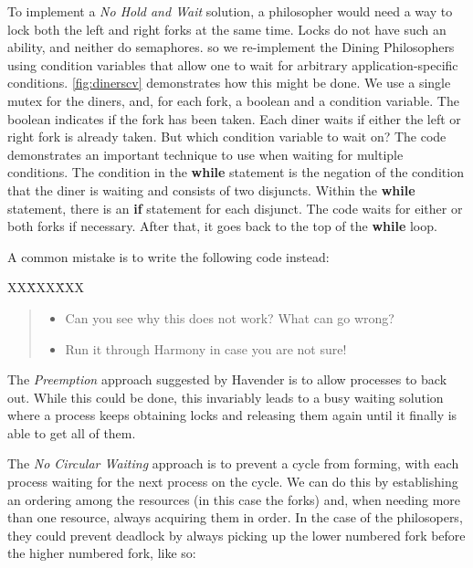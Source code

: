 \documentclass{report}
\newcommand{\harmonysource}[1]{
\begin{tabbing}
XX\=XXX\=XXX\kill
    
\end{tabbing}
}
\newenvironment{code}{
\tcolorbox
}{
\endtcolorbox
}
\begin{document}
To implement a \emph{No Hold and Wait} solution, a philosopher would need a
way to lock both the left and right forks at the same time.  Locks do not
have such an ability, and neither do semaphores. so we re-implement the
Dining Philosophers using condition variables that allow one to wait for
arbitrary application-specific conditions.
%
\autoref{fig:dinerscv} demonstrates how this might be done.
We use a single mutex for the diners, and, for each fork, a boolean
and a condition variable.  The boolean indicates if the fork has been
taken.
Each diner waits if either the left or right fork is already taken.
But which condition variable to wait on?
The code demonstrates an important technique to use when waiting for
multiple conditions.
%
The condition in the \textbf{while} statement is the negation of the
condition that the diner is waiting and consists of two disjuncts.
Within the \textbf{while} statement,
there is an \textbf{if} statement for each disjunct.
The code waits for either or both forks if necessary.  After that, it goes
back to the top of the \textbf{while} loop.

A common mistake is to write the following code instead:

\begin{code}
\harmonysource{baddblwait}
\end{code}

\begin{quote}
\begin{itemize}
\item Can you see why this does not work?  What can go wrong?
\item Run it through Harmony in case you are not sure!
\end{itemize}
\end{quote}

The \emph{Preemption} approach suggested by Havender is to allow processes to back out.
While this could be done, this invariably leads to a busy waiting solution
where a process keeps obtaining locks and releasing them again until it
finally is able to get all of them.

The \emph{No Circular Waiting} approach
is to prevent a cycle from forming, with each
process waiting for the next process on the cycle.
We can do this by establishing an ordering among the
resources (in this case the forks) and, when needing more than one
resource, always acquiring them in order.  In the case of the philosopers,
they could prevent deadlock by always picking up the lower numbered fork
before the higher numbered fork, like so:
\end{document}
